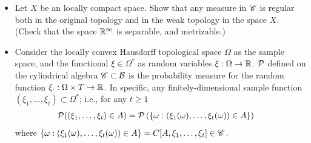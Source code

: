 \documentclass[11pt]{article}
\begin{document}
\begin{itemize}
\item \begin{example}
Let $X$ be an locally compact space. Show that any measure in ${\mathscr C}$ is regular both in the original topology and in the weak topology in the space $X$. (Check that the space ${\mathbb R}^{\infty}$ is separable, and metrizable.)
\end{example}

\item \begin{example}
Consider the locally convex Hausdorff topological space $\Omega$ as the sample space, and the functional $\xi\in \Omega^{*}$ as random variables $\xi: \Omega \rightarrow {\mathbb R}$. ${\mathcal P}$ defined on the cylindrical algebra ${\mathscr C} \subset {\mathcal B}$ is the probability measure for the random function $\xi_{\cdot}: \Omega\times T \rightarrow {\mathbb R} $. In specific, any finitely-dimensional sample function $(\xi_{1}, \ldots, \xi_{t}) \subset \Omega^{*}$; i.e., for any $t\ge 1$
\begin{align*}
{\mathcal P}((\xi_{1}, \ldots, \xi_{t}) \in A)& = {\mathcal P}\left( \left\{\omega:  (\xi_{1}(\omega), \ldots, \xi_{t}(\omega)) \in A \right\}  \right)
\end{align*}
where $ \left\{\omega:  (\xi_{1}(\omega), \ldots, \xi_{t}(\omega)) \in A \right\} = C[A, \xi_{1}, \ldots, \xi_{t}]\in {\mathscr C}$.
\end{example}
\end{itemize}
\newpage


\end{document}
